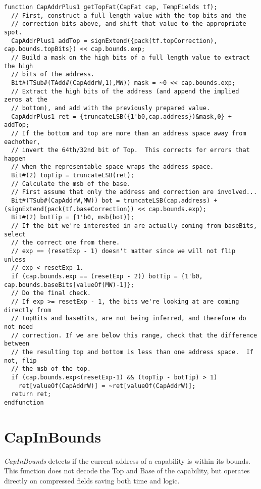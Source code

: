 \begin{lstlisting}[language=bluespec]
function CapAddrPlus1 getTopFat(CapFat cap, TempFields tf);
  // First, construct a full length value with the top bits and the
  // correction bits above, and shift that value to the appropriate spot.
  CapAddrPlus1 addTop = signExtend({pack(tf.topCorrection), cap.bounds.topBits}) << cap.bounds.exp;
  // Build a mask on the high bits of a full length value to extract the high
  // bits of the address.
  Bit#(TSub#(TAdd#(CapAddrW,1),MW)) mask = ~0 << cap.bounds.exp;
  // Extract the high bits of the address (and append the implied zeros at the
  // bottom), and add with the previously prepared value.
  CapAddrPlus1 ret = {truncateLSB({1'b0,cap.address})&mask,0} + addTop;
  // If the bottom and top are more than an address space away from eachother,
  // invert the 64th/32nd bit of Top.  This corrects for errors that happen
  // when the representable space wraps the address space.
  Bit#(2) topTip = truncateLSB(ret);
  // Calculate the msb of the base.
  // First assume that only the address and correction are involved...
  Bit#(TSub#(CapAddrW,MW)) bot = truncateLSB(cap.address) + (signExtend(pack(tf.baseCorrection)) << cap.bounds.exp);
  Bit#(2) botTip = {1'b0, msb(bot)};
  // If the bit we're interested in are actually coming from baseBits, select
  // the correct one from there.
  // exp == (resetExp - 1) doesn't matter since we will not flip unless
  // exp < resetExp-1.
  if (cap.bounds.exp == (resetExp - 2)) botTip = {1'b0, cap.bounds.baseBits[valueOf(MW)-1]};
  // Do the final check.
  // If exp >= resetExp - 1, the bits we're looking at are coming directly from
  // topBits and baseBits, are not being inferred, and therefore do not need
  // correction. If we are below this range, check that the difference between
  // the resulting top and bottom is less than one address space.  If not, flip
  // the msb of the top.
  if (cap.bounds.exp<(resetExp-1) && (topTip - botTip) > 1)
    ret[valueOf(CapAddrW)] = ~ret[valueOf(CapAddrW)];
  return ret;
endfunction
\end{lstlisting}

\section{CapInBounds}
\label{sec:cheri-128-listings-capinbounds}

\emph{CapInBounds} detects if the current address of a capability is within its bounds.
This function does not decode the Top and Base of the capability,
but operates directly on compressed fields saving both time and logic.

